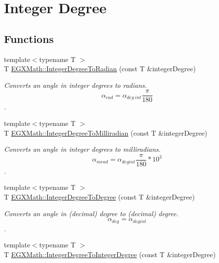 \hypertarget{group___e_g_x_math-_angle_conversions-_integer_degree}{}\section{Integer Degree}
\label{group___e_g_x_math-_angle_conversions-_integer_degree}
\subsection*{Functions}
\begin{DoxyCompactItemize}
\item 
{\footnotesize template$<$typename T $>$ }\\T \mbox{\hyperlink{group___e_g_x_math-_angle_conversions-_integer_degree_ga05d3368b00ea27b9895de2ffe5c8df38}{E\+G\+X\+Math\+::\+Integer\+Degree\+To\+Radian}} (const T \&integer\+Degree)
\begin{DoxyCompactList}\small\item\em Converts an angle in integer degrees to radians. \[\alpha_{rad}=\alpha_{deg\ int}\frac{\pi}{180}\]. \end{DoxyCompactList}\item 
{\footnotesize template$<$typename T $>$ }\\T \mbox{\hyperlink{group___e_g_x_math-_angle_conversions-_integer_degree_ga5379a68bdff5cc4fab5bb1ba06ef9453}{E\+G\+X\+Math\+::\+Integer\+Degree\+To\+Milliradian}} (const T \&integer\+Degree)
\begin{DoxyCompactList}\small\item\em Converts an angle in integer degrees to milliradians. \[\alpha_{mrad}=\alpha_{degint}\frac{\pi}{180}*10^3\]. \end{DoxyCompactList}\item 
{\footnotesize template$<$typename T $>$ }\\T \mbox{\hyperlink{group___e_g_x_math-_angle_conversions-_integer_degree_gaa9b63c6095fd7f8809fcfa2ba1e62235}{E\+G\+X\+Math\+::\+Integer\+Degree\+To\+Degree}} (const T \&integer\+Degree)
\begin{DoxyCompactList}\small\item\em Converts an angle in (decimal) degree to (decimal) degree. \[\alpha_{deg}=\alpha_{deg int}\]. \end{DoxyCompactList}\item 
{\footnotesize template$<$typename T $>$ }\\T \mbox{\hyperlink{group___e_g_x_math-_angle_conversions-_integer_degree_gac9e870bdfa60dd2bb61469fdf6eedd7c}{E\+G\+X\+Math\+::\+Integer\+Degree\+To\+Integer\+Degree}} (const T \&integer\+Degree)

\end{DoxyCompactItemize}
